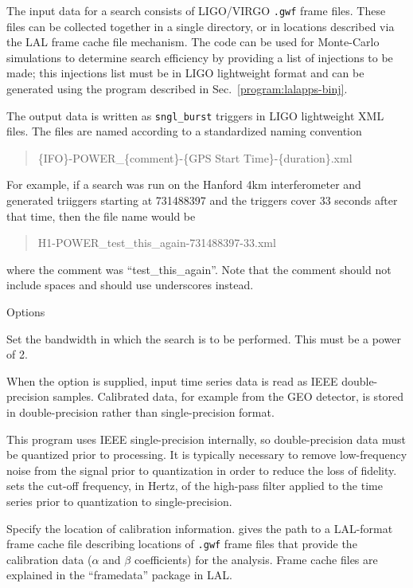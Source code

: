 \begin{entry}
The input data for a search consists of LIGO/VIRGO \texttt{.gwf} frame
files.  These files can be collected together in a single directory, or in
locations described via the LAL frame cache file mechanism.  The code can
be used for Monte-Carlo simulations to determine search efficiency by
providing a list of injections to be made;  this injections list must be in
LIGO lightweight format and can be generated using the 
program described in Sec.~\ref{program:lalapps-binj}. 

The output data is written as \verb|sngl_burst| triggers in LIGO
lightweight XML files.  The files are named according to a standardized
naming convention
\begin{quote}
\{IFO\}-POWER\_\{comment\}-\{GPS Start Time\}-\{duration\}.xml
\end{quote}
For example, if a search was run on the Hanford 4km interferometer and
generated triiggers starting at 731488397 and the triggers cover 33 seconds
after that time,  then the file name would be 
\begin{quote}
H1-POWER\_test\_this\_again-731488397-33.xml
\end{quote}
where the comment was ``test\_this\_again''.  Note that the comment should
not include spaces and should use underscores instead.

\item[Options]\leavevmode
\begin{entry}
\item[\option{--bandwidth} \parm{Hz}]
Set the bandwidth in which the search is to be performed.  This must be a
power of 2.

\item[\option{--calibrated-data} \parm{high pass frequency}]
When the  option is supplied, input time series
data is read as IEEE double-precision samples.  Calibrated data, for
example from the GEO detector, is stored in double-precision rather than
single-precision format.

This program uses IEEE single-precision internally, so double-precision
data must be quantized prior to processing.  It is typically necessary to
remove low-frequency noise from the signal prior to quantization in order
to reduce the loss of fidelity.   sets the
cut-off frequency, in Hertz, of the high-pass filter applied to the time
series prior to quantization to single-precision.

\item[\option{--calibration-cache} \parm{cache file}]
Specify the location of calibration information.   gives
the path to a LAL-format frame cache file describing locations of
\texttt{.gwf} frame files that provide the calibration data ($\alpha$ and
$\beta$ coefficients) for the analysis.  Frame cache files are explained in
the ``framedata'' package in LAL.


\end{entry}
\end{entry}
